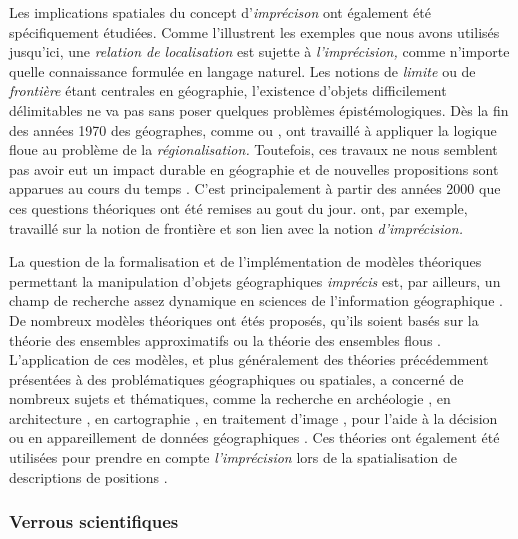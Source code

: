 Les implications spatiales du concept d'\emph{imprécison} ont
également été spécifiquement étudiées. Comme l'illustrent les exemples
que nous avons utilisés jusqu'ici, une \emph{relation de localisation}
est sujette à \emph{l'imprécision,} comme n'importe quelle
connaissance formulée en langage naturel. Les notions de \emph{limite}
ou de \emph{frontière} étant centrales en géographie, l’existence
d'objets difficilement délimitables ne va pas sans poser quelques
problèmes épistémologiques. Dès la fin des années 1970 des géographes,
comme \textcite{Gale1976} ou \textcite{Leung1979}, ont travaillé à
appliquer la logique floue au problème de la \emph{régionalisation.}
Toutefois, ces travaux ne nous semblent pas avoir eut un impact
durable en géographie et de nouvelles propositions sont apparues au
cours du temps \autocite{Bunel2020}. C'est principalement à partir des
années 2000 que ces questions théoriques ont été remises au gout du
jour. \textcite{Varzi2001,Varzi2015,Smith2000,Collins2000} ont, par
exemple, travaillé sur la notion de frontière et son lien avec la
notion \emph{d'imprécision.}

La question de la formalisation et de l'implémentation de modèles
théoriques permettant la manipulation d'objets géographiques
\emph{imprécis} est, par ailleurs, un champ de recherche assez
dynamique en sciences de l'information géographique
\autocite{Bunel2020}. De nombreux modèles théoriques ont étés
proposés, qu'ils soient basés sur la théorie des ensembles
approximatifs \autocite{Schneider1996,Cohn1996,Clementini1996} ou la
théorie des ensembles flous \autocite{Schneider1999}. L’application de
ces modèles, et plus généralement des théories précédemment présentées
à des problématiques géographiques ou spatiales, a concerné de
nombreux sujets et thématiques, comme la recherche en archéologie
\autocite{Runz2008a, Zoghlami2016}, en architecture
\autocite{Arabacioglu2010}, en cartographie
\autocite{Didelon2009,Didelon2011}, en traitement d'image
\autocite{Brandtberg2002}, pour l'aide à la décision
\autocite{Griot2007,Makropoulos2003} ou en appareillement de données
géographiques \autocite{Olteanu-Raimond2008}. Ces théories ont
également été utilisées pour prendre en compte \emph{l'imprécision}
lors de la spatialisation de descriptions de positions
\autocite{Takemura2012,Vanegas2011,Bloch1996,Hudelot2008}.

\subsubsection{Verrous scientifiques}

